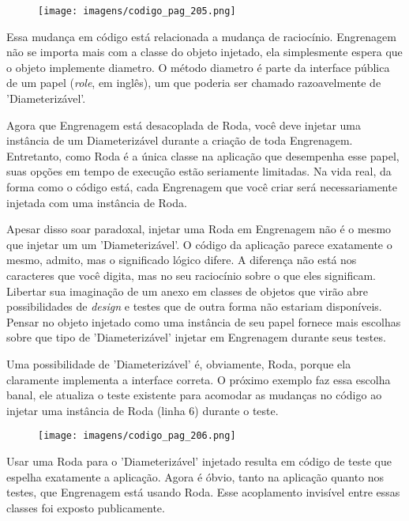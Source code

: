 \begin{figure}[!htbp]
  \center
  \texttt{[image: imagens/codigo\_pag\_205.png]}
  \label{img:codigo_pag_205}
\end{figure}

Essa mudança em código está relacionada a mudança de raciocínio.
Engrenagem não se importa mais com a classe do objeto injetado, ela simplesmente
espera que o objeto implemente diametro. O método diametro é parte da interface
pública de um papel (\textit{role}, em inglês), um que poderia ser chamado
razoavelmente de 'Diameterizável'.

Agora que Engrenagem está desacoplada de Roda, você deve injetar uma instância
de um Diameterizável durante a criação de toda Engrenagem. Entretanto, como
Roda é a única classe na aplicação que desempenha esse papel, suas opções em
tempo de execução estão seriamente limitadas. Na vida real, da forma como o
código está, cada Engrenagem que você criar será necessariamente injetada com uma
instância de Roda.

Apesar disso soar paradoxal, injetar uma Roda em Engrenagem não é o mesmo que
injetar um um 'Diameterizável'. O código da aplicação parece exatamente o mesmo,
admito, mas o significado lógico difere. A diferença não está nos caracteres
que você digita, mas no seu raciocínio sobre o que eles significam. Libertar sua
imaginação de um anexo em classes de objetos que virão abre possibilidades de
\textit{design} e testes que de outra forma não estariam disponíveis. Pensar no
objeto injetado como uma instância de seu papel fornece mais escolhas sobre
que tipo de 'Diameterizável' injetar em Engrenagem durante seus testes.

Uma possibilidade de 'Diameterizável' é, obviamente, Roda, porque ela claramente
implementa a interface correta. O próximo exemplo faz essa escolha banal, ele
atualiza o teste existente para acomodar as mudanças no código ao injetar uma
instância de Roda (linha 6) durante o teste.

\begin{figure}[!htbp]
  \center
  \texttt{[image: imagens/codigo\_pag\_206.png]}
  \label{img:codigo_pag_206}
\end{figure}

Usar uma Roda para o 'Diameterizável' injetado resulta em código
de teste que espelha exatamente a aplicação. Agora é óbvio,
tanto na aplicação quanto nos testes, que Engrenagem está usando
Roda. Esse acoplamento invisível entre essas classes foi exposto
publicamente.

